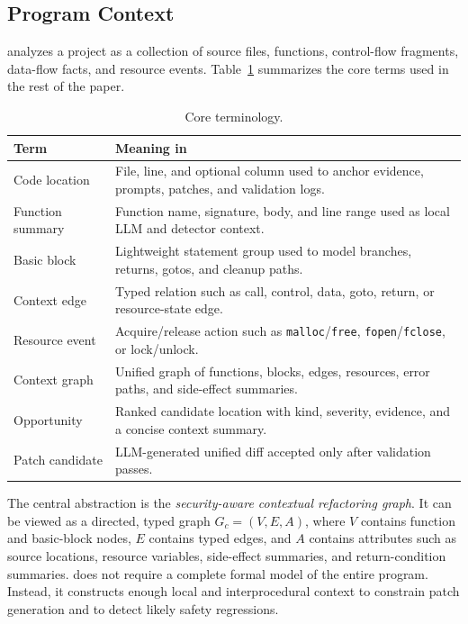 \subsection{Program Context}
\label{sec:prelim-context}

\SysName{} analyzes a project as a collection of source files, functions, control-flow
fragments, data-flow facts, and resource events. Table~\ref{tab:prelim-terms}
summarizes the core terms used in the rest of the paper.

\begin{table}[t]
  \centering
  \caption{Core \SysName{} terminology.}
  \label{tab:prelim-terms}
  \footnotesize
  \begin{tabularx}{\columnwidth}{@{}>{\raggedright\arraybackslash}p{}>{\raggedright\arraybackslash}X@{}}
    \toprule
    \textbf{Term} & \textbf{Meaning in \SysName{}} \\
    \midrule
    Code location &
    File, line, and optional column used to anchor evidence, prompts, patches, and validation logs. \\
    Function summary &
    Function name, signature, body, and line range used as local LLM and detector context. \\
    Basic block &
    Lightweight statement group used to model branches, returns, gotos, and cleanup paths. \\
    Context edge &
    Typed relation such as call, control, data, goto, return, or resource-state edge. \\
    Resource event &
    Acquire/release action such as \texttt{malloc}/\texttt{free}, \texttt{fopen}/\texttt{fclose}, or lock/unlock. \\
    Context graph &
    Unified graph of functions, blocks, edges, resources, error paths, and side-effect summaries. \\
    Opportunity &
    Ranked candidate location with kind, severity, evidence, and a concise context summary. \\
    Patch candidate &
    LLM-generated unified diff accepted only after \SysName{} validation passes. \\
    \bottomrule
  \end{tabularx}
\end{table}

The central abstraction is the \emph{security-aware contextual refactoring graph}.
It can be viewed as a directed, typed graph
$G_c=(V,E,A)$, where $V$ contains function and basic-block nodes, $E$ contains
typed edges, and $A$ contains attributes such as source locations, resource
variables, side-effect summaries, and return-condition summaries. \SysName{} does not
require a complete formal model of the entire program. Instead, it constructs
enough local and interprocedural context to constrain patch generation and to
detect likely safety regressions.

